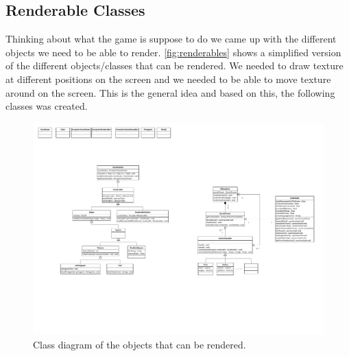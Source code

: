 \subsection{Renderable Classes}

Thinking about what the game is suppose to do we came up with the different objects we need to be able to render. \autoref{fig:renderables} shows a simplified version of the different objects/classes that can be rendered. We needed to draw texture at different positions on the screen and we needed to be able to move texture around on the screen. This is the general idea and based on this, the following classes was created.

\begin{figure}[H]
\centering
\includegraphics[page=2,width=1\linewidth]{img/opengl.pdf}
\caption{Class diagram of the objects that can be rendered.}
\label{fig:renderables}
\end{figure}

